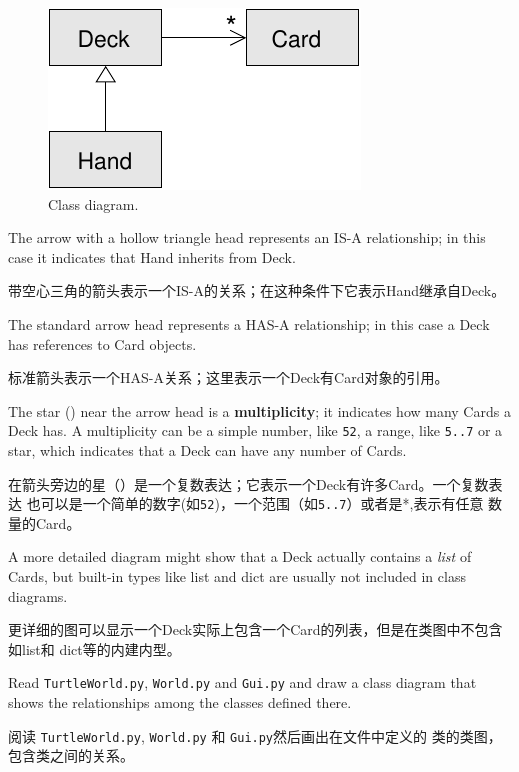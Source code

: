 \documentclass[10pt]{book}
\begin{document}
\begin{CJK}{UTF8}{gbsn}
\begin{figure}
\centerline
{\includegraphics[scale=0.8]{figs/class1.pdf}}
\caption{Class diagram.}
\label{fig.class1}
\end{figure}


The arrow with a hollow triangle head represents an IS-A
relationship; in this case it indicates that Hand inherits
from Deck.

带空心三角的箭头表示一个IS-A的关系；在这种条件下它表示Hand继承自Deck。

The standard arrow head represents a HAS-A
relationship; in this case a Deck has references to Card
objects.

标准箭头表示一个HAS-A关系；这里表示一个Deck有Card对象的引用。

The star ({\tt *}) near the arrow head is a 
{\bf multiplicity}; it indicates how many Cards a Deck has.
A multiplicity can be a simple number, like {\tt 52}, a range,
like {\tt 5..7} or a star, which indicates that a Deck can
have any number of Cards.

在箭头旁边的星（{\tt *}）是一个复数表达；它表示一个Deck有许多Card。一个复数表达
也可以是一个简单的数字(如{\tt 52})，一个范围（如{\tt 5..7}）或者是*,表示有任意
数量的Card。

A more detailed diagram might show that a Deck actually
contains a {\em list} of Cards, but built-in types
like list and dict are usually not included in class diagrams.

更详细的图可以显示一个Deck实际上包含一个Card的列表，但是在类图中不包含如list和
dict等的内建内型。

\begin{exercise}

Read {\tt TurtleWorld.py}, {\tt World.py} and {\tt Gui.py}
and draw a class diagram that shows the relationships among
the classes defined there.

阅读 {\tt TurtleWorld.py}, {\tt World.py} 和 {\tt Gui.py}然后画出在文件中定义的
类的类图，包含类之间的关系。


\end{exercise}
\end{CJK}
\end{document}
